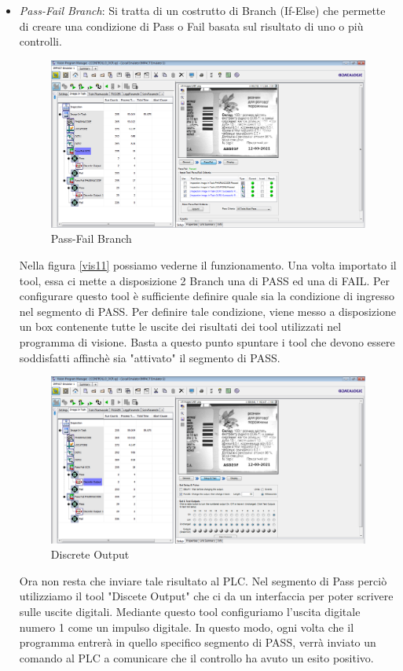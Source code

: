 \documentclass[12pt, a4paper, oneside]{book}
\begin{document}
\begin{itemize}
	\item \textit{Pass-Fail Branch}: Si tratta di un costrutto di Branch (If-Else) che permette di creare una condizione di Pass o Fail basata sul risultato di uno o più controlli.
	
			\begin{figure}[H]
		\centering
		\includegraphics[width=13cm]{Immagini/VIS12}
		\caption{Pass-Fail Branch}
		\label{vis12}
			\end{figure}
		
		Nella figura \ref{vis11} possiamo vederne il funzionamento. Una volta importato il tool, essa ci mette a disposizione 2 Branch una di PASS ed una di FAIL. Per configurare questo tool è sufficiente definire quale sia la condizione di ingresso nel segmento di PASS. Per definire tale condizione, viene messo a disposizione un box contenente tutte le uscite dei risultati dei tool utilizzati nel programma di visione. Basta a questo punto spuntare i tool che devono essere soddisfatti affinchè sia "attivato" il segmento di PASS.
		
		\begin{figure}[H]
			\centering
			\includegraphics[width=13cm]{Immagini/VIS13}
			\caption{Discrete Output}
			\label{vis13}
		\end{figure}
	
		Ora non resta che inviare tale risultato al PLC. Nel segmento di Pass perciò utilizziamo il tool "Discete Output" che ci da un interfaccia per poter scrivere sulle uscite digitali. Mediante questo tool configuriamo l'uscita digitale numero 1 come un impulso digitale. In questo modo, ogni volta che il programma entrerà in quello specifico segmento di PASS, verrà inviato un comando al PLC a comunicare che il controllo ha avuto un esito positivo.
		
		 
\end{itemize}
\end{document}
